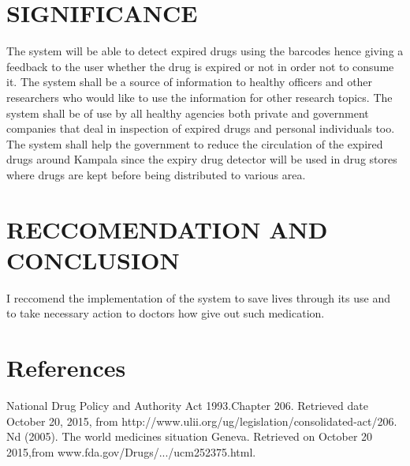 \documentclass{article}
\begin{document}
\section{SIGNIFICANCE}
The system will be able to detect expired drugs using the barcodes hence giving a feedback to the user whether the drug is expired or not in order not to consume it. 
The system shall be a source of information to healthy officers and other researchers who would like to use the information for other research topics. 
The system shall be of use by all healthy agencies both private and government companies that deal in inspection of expired drugs and personal individuals too. 
The system shall help the government to reduce the circulation of the expired drugs around Kampala since the expiry drug detector will be used in drug stores where drugs are kept before being distributed to various area.

\section{RECCOMENDATION AND CONCLUSION}
I reccomend the implementation of the system to save lives through its use and to take necessary action to doctors how give out such medication.

\section{References}

National Drug Policy and Authority Act 1993.Chapter 206. Retrieved date October 20, 2015, from http://www.ulii.org/ug/legislation/consolidated-act/206.
Nd (2005). The world medicines situation Geneva. Retrieved on October 20 2015,from www.fda.gov/Drugs/.../ucm252375.html.
\end{document}
